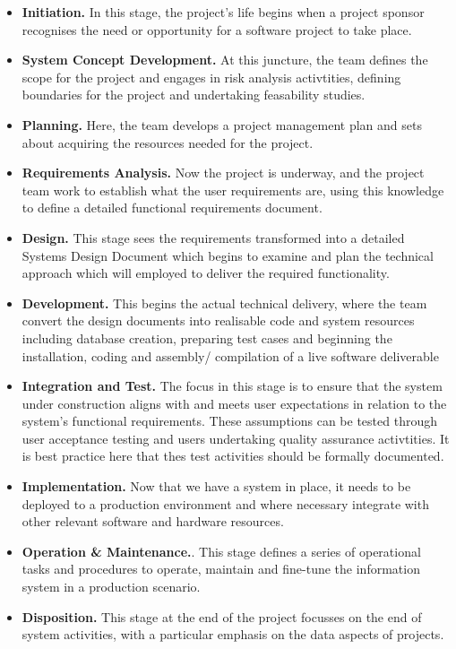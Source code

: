 \documentclass[a4paper,12pt]{article}
\begin{document}
\begin{samepage}
\begin{samepage}
\begin{itemize}
\item  \textbf{Initiation.} In this stage, the project's life begins when a project sponsor recognises the need or opportunity for a software project to take place.
\item  \textbf {System Concept Development.} At this juncture, the team defines the scope for the project and engages in risk analysis activtities, defining boundaries for the project and undertaking feasability studies.
\item  \textbf{Planning.} Here, the team develops a project management plan and sets about acquiring the resources needed for the project.
\item  \textbf{Requirements Analysis.} Now the project is underway, and the project team work to establish what the user requirements are, using this knowledge to define a detailed functional requirements document.
\item  \textbf{Design.} This stage sees the requirements transformed into a detailed Systems Design Document which begins to examine and plan the technical approach which will employed to deliver the required functionality.
\item  \textbf{Development.} This begins the actual technical delivery, where the team convert the design documents into realisable code and system resources including database creation, preparing test cases and beginning the installation, coding and assembly/ compilation of a live software deliverable
\item  \textbf{Integration and Test.} The focus in this stage is to ensure that the system under construction aligns with and meets user expectations in relation to the system's functional requirements. These assumptions can be tested through user acceptance testing and users undertaking quality assurance activtities. It is best practice here that thes test activities should be formally documented. 
\newpage
\item  \textbf{Implementation.} Now that we have a system in place, it needs to be deployed to a production environment and where necessary integrate with other relevant software and hardware resources.
\item  \textbf{Operation \& Maintenance.}. This stage defines a series of operational tasks and procedures to operate, maintain and fine-tune the information system in a production scenario.
\item  \textbf{Disposition.} This stage at the end of the project focusses on the end of system activities, with a particular emphasis on the data aspects of projects.
\end{itemize}



\end{samepage}
\end{samepage}
\end{document}
